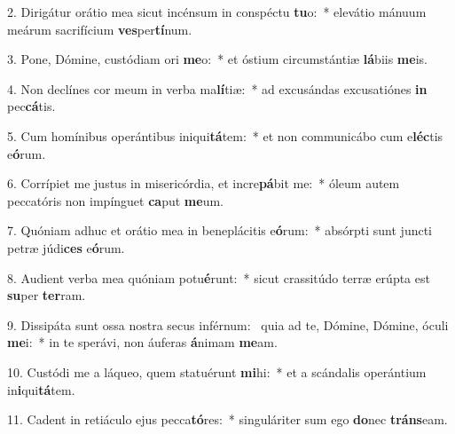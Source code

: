2. Dirigátur orátio mea sicut incénsum in conspéctu \textbf{tu}o:~*  elevátio mánuum meárum sacrifícium \textbf{ves}per\textbf{tí}num.\

3. Pone, Dómine, custódiam ori \textbf{me}o:~*  et óstium circumstántiæ \textbf{lá}biis \textbf{me}is.\

4. Non declínes cor meum in verba ma\textbf{lí}tiæ:~*  ad excusándas excusatiónes \textbf{in} pec\textbf{cá}tis.\

5. Cum homínibus operántibus iniqui\textbf{tá}tem:~*  et non communicábo cum e\textbf{léc}tis e\textbf{ó}rum.\

6. Corrípiet me justus in misericórdia, et incre\textbf{pá}bit me:~*  óleum autem peccatóris non impínguet \textbf{ca}put \textbf{me}um.\

7. Quóniam adhuc et orátio mea in beneplácitis e\textbf{ó}rum:~*  absórpti sunt juncti petræ júdi\textbf{ces} e\textbf{ó}rum.\

8. Audient verba mea quóniam potu\textbf{é}runt:~*  sicut crassitúdo terræ erúpta est \textbf{su}per \textbf{ter}ram.\

9. Dissipáta sunt ossa nostra secus inférnum: \dag\  quia ad te, Dómine, Dómine, óculi \textbf{me}i:~*  in te sperávi, non áuferas \textbf{á}nimam \textbf{me}am.\

10. Custódi me a láqueo, quem statuérunt \textbf{mi}hi:~*  et a scándalis operántium in\textbf{i}qui\textbf{tá}tem.\

11. Cadent in retiáculo ejus pecca\textbf{tó}res:~*  singuláriter sum ego \textbf{do}nec \textbf{tráns}eam.\

